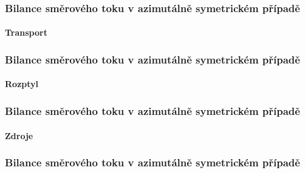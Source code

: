 \begin{frame}
  \frametitle{Bilance směrového toku v azimutálně symetrickém případě}
  \framesubtitle{Transport}


\end{frame}

\begin{frame}
  \frametitle{Bilance směrového toku v azimutálně symetrickém případě}
  \framesubtitle{Rozptyl}


\end{frame}

\begin{frame}
  \frametitle{Bilance směrového toku v azimutálně symetrickém případě}
  \framesubtitle{Zdroje}


\end{frame}

\begin{frame}
  \frametitle{Bilance směrového toku v azimutálně symetrickém případě}

\end{frame}


